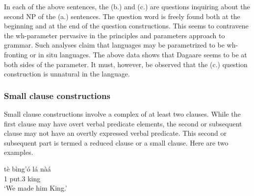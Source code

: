 \ea {}
\z\z 

\ea {}
\z\z

In each of the above sentences, the (b.) and (c.) are questions inquiring about the second NP of
the (a.) sentences. The question word is freely found both at the beginning and at the end of the
question constructions. This seems to contravene the wh-parameter pervasive in the principles
and parameters approach to grammar. Such analyses claim that languages may be
parametrized to be wh-fronting or in situ languages. The above data shows that Dagaare seems to be at both sides of the parameter. It must, however, be observed that the (c.) question
construction is unnatural in the language.

\subsubsection{Small clause constructions}
Small clause constructions involve a complex of at least two clauses. While the first
clause may have overt verbal predicate elements, the second or subsequent clause may
not have an overtly expressed verbal predicate. This second or subsequent part is termed a
reduced clause or a small clause.  Here
are two examples.


\ea\label{ex:smallclause1} \gll tè bìng’ó lá nàá\\
1{\PL} put.3{\SG} {\FOC} king\\
\glt ‘We made him King.’\z

\ea {}
\z\z


